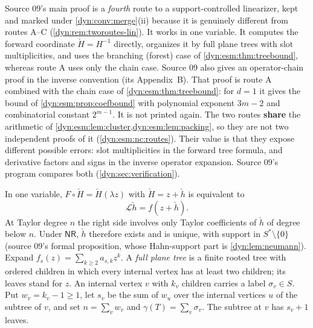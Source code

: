 \documentclass[11pt,letterpaper]{article}
\theoremstyle{definition}
\theoremstyle{remark}
\newcommand{\Li}{\mathcal L}
\newcommand{\nres}{\mathsf{NR}}
\numberwithin{equation}{section}
\begin{document}
Source 09's main proof is a \emph{fourth} route to a support-controlled
linearizer, kept and marked under \cref{dyn:conv:merge}(ii) because it is
genuinely different from routes A--C (\cref{dyn:rem:tworoutes-lin}). It
works in one variable. It computes the forward coordinate
$\check H=H^{-1}$ directly, organizes it by full plane trees with slot
multiplicities, and uses the branching (forest) case of
\cref{dyn:esm:thm:treebound}, whereas route A uses only the chain case.
Source 09 also gives an operator-chain proof in the inverse convention (its
Appendix~B). That proof is route A combined with the chain case of
\cref{dyn:esm:thm:treebound}: for $d=1$ it gives the bound of
\cref{dyn:esm:prop:coefbound} with polynomial exponent $3m-2$ and
combinatorial constant $2^{m-1}$. It is not printed again. The two routes
\textbf{share} the arithmetic of
\cref{dyn:esm:lem:cluster,dyn:esm:lem:packing}, so they are not two
independent proofs of it (\ref{dyn:esm:nc:routes}). Their value is that they expose
different possible errors: slot multiplicities in the forward tree formula,
and derivative factors and signs in the inverse operator expansion. Source
09's program compares both (\cref{dyn:sec:verification}).

In one variable, $F\circ\check H=\check H(\lambda z)$ with $\check H=z+\check h$
is equivalent to
\begin{equation}\label{dyn:tree:eq:forward}
 \Li\check h=f(z+\check h).
\end{equation}
At Taylor degree $n$ the right side involves only Taylor coefficients of
$\check h$ of degree below $n$. Under $\nres$, $\check h$ therefore exists
and is unique, with support in $S^{*}\setminus\{0\}$ (source 09's formal
proposition, whose Hahn-support part is \cref{dyn:lem:neumann}). Expand
$f_s(z)=\sum_{k\ge2}a_{s,k}z^{k}$. A \emph{full plane tree} is a finite
rooted tree with ordered children in which every internal vertex has at
least two children; its leaves stand for $z$. An internal vertex $v$ with
$k_v$ children carries a label $\sigma_v\in S$. Put $w_v=k_v-1\ge1$, let
$s_v$ be the sum of $w_u$ over the internal vertices $u$ of the subtree of
$v$, and set $n=\sum_vw_v$ and $\gamma(T)=\sum_v\sigma_v$. The subtree at $v$
has $s_v+1$ leaves.
\end{document}
